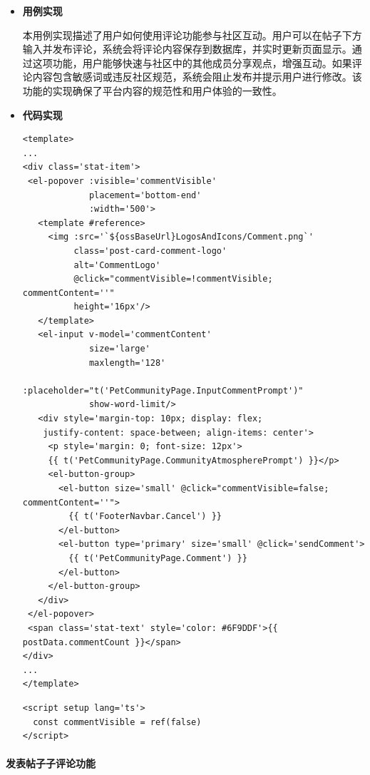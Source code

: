 \begin{itemize}
	\item \textbf{用例实现}
	
	本用例实现描述了用户如何使用评论功能参与社区互动。用户可以在帖子下方输入并发布评论，系统会将评论内容保存到数据库，并实时更新页面显示。通过这项功能，用户能够快速与社区中的其他成员分享观点，增强互动。如果评论内容包含敏感词或违反社区规范，系统会阻止发布并提示用户进行修改。该功能的实现确保了平台内容的规范性和用户体验的一致性。
	
	\item \textbf{代码实现}
	\begin{verbatim}
<template>
...
<div class='stat-item'>
 <el-popover :visible='commentVisible'
             placement='bottom-end'
             :width='500'>
   <template #reference>
     <img :src='`${ossBaseUrl}LogosAndIcons/Comment.png`'
          class='post-card-comment-logo'
          alt='CommentLogo'
          @click="commentVisible=!commentVisible; commentContent=''"
          height='16px'/>
   </template>
   <el-input v-model='commentContent'
             size='large'
             maxlength='128'
             :placeholder="t('PetCommunityPage.InputCommentPrompt')"
             show-word-limit/>
   <div style='margin-top: 10px; display: flex;
    justify-content: space-between; align-items: center'>
     <p style='margin: 0; font-size: 12px'>
     {{ t('PetCommunityPage.CommunityAtmospherePrompt') }}</p>
     <el-button-group>
       <el-button size='small' @click="commentVisible=false; commentContent=''">
         {{ t('FooterNavbar.Cancel') }}
       </el-button>
       <el-button type='primary' size='small' @click='sendComment'>
         {{ t('PetCommunityPage.Comment') }}
       </el-button>
     </el-button-group>
   </div>
 </el-popover>
 <span class='stat-text' style='color: #6F9DDF'>{{ postData.commentCount }}</span>
</div>
...
</template>
	\end{verbatim}
	
	\begin{verbatim}
<script setup lang='ts'>
  const commentVisible = ref(false)
</script>
	\end{verbatim}
	
\end{itemize}

\paragraph{发表帖子子评论功能}

